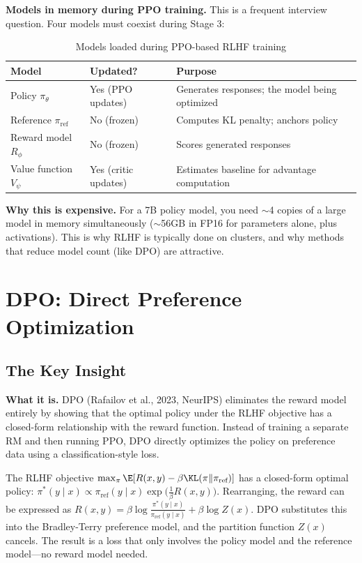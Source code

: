 \textbf{Models in memory during PPO training.} This is a frequent interview question. Four models must coexist during Stage 3:

\begin{table}[H]
\centering
\caption{Models loaded during PPO-based RLHF training}
\begin{tabularx}{\textwidth}{llX}
\toprule
\textbf{Model} & \textbf{Updated?} & \textbf{Purpose} \\
\midrule
Policy $\pi_\theta$ & Yes (PPO updates) & Generates responses; the model being optimized \\
Reference $\pi_{\text{ref}}$ & No (frozen) & Computes KL penalty; anchors policy \\
Reward model $R_\phi$ & No (frozen) & Scores generated responses \\
Value function $V_\psi$ & Yes (critic updates) & Estimates baseline for advantage computation \\
\bottomrule
\end{tabularx}
\end{table}

\textbf{Why this is expensive.} For a 7B policy model, you need $\sim$4 copies of a large model in memory simultaneously ($\sim$56GB in FP16 for parameters alone, plus activations). This is why RLHF is typically done on clusters, and why methods that reduce model count (like DPO) are attractive.

\section{DPO: Direct Preference Optimization}
\label{sec:dpo}

\subsection{The Key Insight}

\textbf{What it is.} DPO (Rafailov et al., 2023, NeurIPS) eliminates the reward model entirely by showing that the optimal policy under the RLHF objective has a closed-form relationship with the reward function. Instead of training a separate RM and then running PPO, DPO directly optimizes the policy on preference data using a classification-style loss.

\begin{keyinsight}
The RLHF objective $\max_\pi \E[R(x,y) - \beta \KL(\pi \| \pi_{\text{ref}})]$ has a closed-form optimal policy: $\pi^*(y \mid x) \propto \pi_{\text{ref}}(y \mid x) \exp\!\big(\frac{1}{\beta}R(x,y)\big)$. Rearranging, the reward can be expressed as $R(x,y) = \beta \log \frac{\pi^*(y \mid x)}{\pi_{\text{ref}}(y \mid x)} + \beta \log Z(x)$. DPO substitutes this into the Bradley-Terry preference model, and the partition function $Z(x)$ cancels. The result is a loss that only involves the policy model and the reference model---no reward model needed.
\end{keyinsight}

